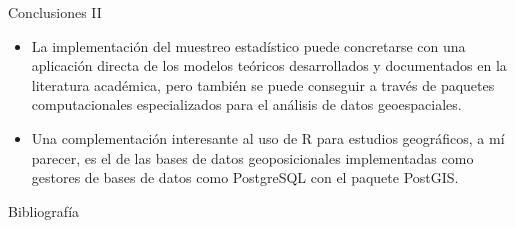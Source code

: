 \documentclass[12pts]{beamer}
\begin{document}
	\begin{frame}{Conclusiones II}
		\begin{itemize}
			\item La implementación del muestreo estadístico puede concretarse con una aplicación directa de los modelos teóricos desarrollados y documentados en la literatura académica, pero también se puede conseguir a través de paquetes computacionales especializados para el análisis de datos geoespaciales. 
			\item Una complementación interesante al uso de R para estudios geográficos, a mí parecer, es el de las bases de datos geoposicionales implementadas como gestores de bases de datos como PostgreSQL con el paquete PostGIS.
		\end{itemize}
	\end{frame}

	\begin{frame}[allowframebreaks]{Bibliografía}
	
			\nocite{Alinghaus.1996} \nocite{Benedetti.2015} \nocite{Brus.2022} \nocite{Cressie.1986} \nocite{Cressie.1989} \nocite{Grondona.1991} \nocite{Hohn.1993} \nocite{Journel.1987} \nocite{Thompson.2012}
			
		
		
	\end{frame}
	
\end{document}
